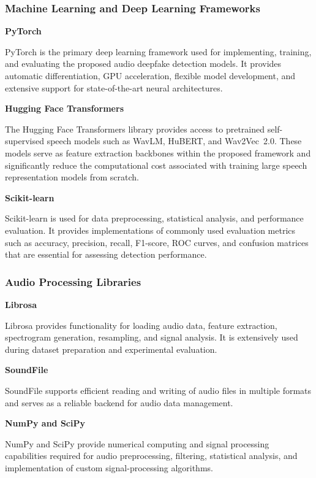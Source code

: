 \subsubsection{Machine Learning and Deep Learning Frameworks}
\vspace{0.5cm}
\textbf{PyTorch}

PyTorch is the primary deep learning framework used for implementing, training, and evaluating the proposed audio deepfake detection models. It provides automatic differentiation, GPU acceleration, flexible model development, and extensive support for state-of-the-art neural architectures.

\textbf{Hugging Face Transformers}

The Hugging Face Transformers library provides access to pretrained self-supervised speech models such as WavLM, HuBERT, and Wav2Vec~2.0. These models serve as feature extraction backbones within the proposed framework and significantly reduce the computational cost associated with training large speech representation models from scratch.

\textbf{Scikit-learn}

Scikit-learn is used for data preprocessing, statistical analysis, and performance evaluation. It provides implementations of commonly used evaluation metrics such as accuracy, precision, recall, F1-score, ROC curves, and confusion matrices that are essential for assessing detection performance.


\subsubsection{Audio Processing Libraries}
\vspace{0.5cm}
\textbf{Librosa}

Librosa provides functionality for loading audio data, feature extraction, spectrogram generation, resampling, and signal analysis. It is extensively used during dataset preparation and experimental evaluation.

\textbf{SoundFile}

SoundFile supports efficient reading and writing of audio files in multiple formats and serves as a reliable backend for audio data management.

\textbf{NumPy and SciPy}

NumPy and SciPy provide numerical computing and signal processing capabilities required for audio preprocessing, filtering, statistical analysis, and implementation of custom signal-processing algorithms.


